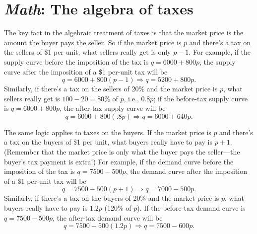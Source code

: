 



\section{\emph{Math}: The algebra of taxes}

The key fact in the algebraic treatment of taxes is that the market price is the amount the buyer pays the seller. So if the market price is $p$ and there's a tax on the sellers of \$1 per unit, what sellers really get is only $p-1$. For example, if the supply curve before the imposition of the tax is $q=6000+800p$, the supply curve after the imposition of a \$1 per-unit tax will be
\[
q=6000+800(p-1)\Longrightarrow q=5200+800p.
\]
Similarly, if there's a tax on the sellers of 20\% and the market price is $p$, what sellers really get is $100-20=80\%$ of $p$, i.e., $0.8p$; if the before-tax supply curve is $q=6000+800p$, the after-tax supply curve will be
\[
q=6000+800(.8p)\Longrightarrow q=6000+640p.
\]


The same logic applies to taxes on the buyers. If the market price is $p$ and there's a tax on the buyers of \$1 per unit, what buyers really have to pay is $p+1$. (Remember that the market price is only what the buyer pays the seller---the buyer's tax payment is extra!) For example, if the demand curve before the imposition of the tax is $q=7500-500p$, the demand curve after the imposition of a \$1 per-unit tax will be
\[
q=7500-500(p+1)\Longrightarrow q=7000-500p.
\]
Similarly, if there's a tax on the buyers of 20\% and the market price is $p$, what buyers really have to pay is $1.2p$ (120\% of $p$). If the before-tax demand curve is $q=7500-500p$, the after-tax demand curve will be
\[
q=7500-500(1.2p)\Longrightarrow q=7500-600p.
\]




